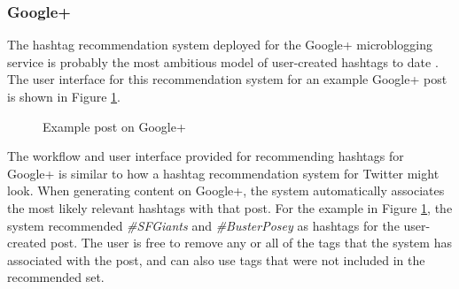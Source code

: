 \documentclass[man,floatsintext,donotrepeattitle]{apa6}
\begin{document}
\subsubsection{Google+}

The hashtag recommendation system deployed for the Google+ microblogging service is probably the most ambitious model of user-created hashtags to date \parencite{GoogleKeynote2013}.
The user interface for this recommendation system for an example Google+ post is shown in Figure \ref{figGoogle+Hashtags}.

\begin{figure}[!htbp]
  \caption{Example post on Google+}
  \label{figGoogle+Hashtags}
\end{figure}

The workflow and user interface provided for recommending hashtags for Google+ is similar to how a hashtag recommendation system for Twitter might look.
When generating content on Google+, the system automatically associates the most likely relevant hashtags with that post.
For the example in Figure \ref{figGoogle+Hashtags}, the system recommended \emph{\#SFGiants} and \emph{\#BusterPosey} as hashtags for the user-created post.
The user is free to remove any or all of the tags that the system has associated with the post, and can also use tags that were not included in the recommended set.
\end{document}
